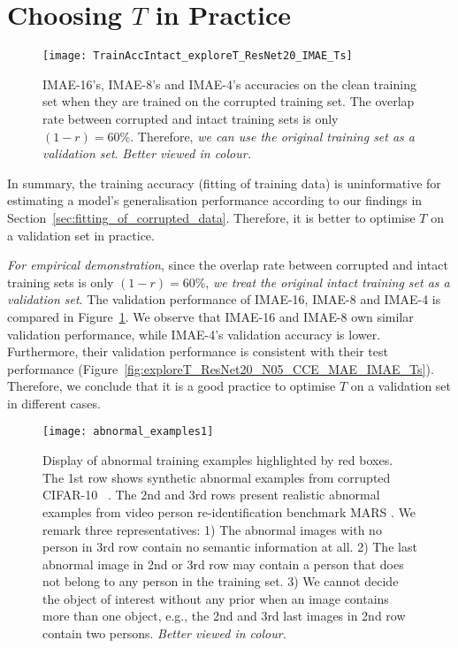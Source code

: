 \documentclass{article}
\begin{document}
\section{Choosing $T$ in Practice}

\begin{figure}[!h]
	\centering
	\texttt{[image: TrainAccIntact\_exploreT\_ResNet20\_IMAE\_Ts]}
	\caption{
		IMAE-16's, IMAE-8's and IMAE-4's accuracies on the clean training set when they are trained on the corrupted training set.
		The overlap rate between corrupted and intact training sets is only $(1-r)= 60\%$. Therefore, \textit{we can use the original training set as a validation set}.  
		\textit{Better viewed in colour.}
	}
	\label{fig:TrainAccIntact_exploreT_ResNet20_IMAE_Ts}
\end{figure}


In summary, the training accuracy (fitting of training data) is uninformative for estimating a model's generalisation performance according to our findings in Section~\ref{sec:fitting_of_corrupted_data}. 
Therefore, it is better to optimise $T$ on a validation set in practice.

\textit{For empirical demonstration}, since the overlap rate between corrupted and intact training sets is only $(1-r)= 60\%$, \textit{{we treat the original intact training set as a validation set}}. The validation performance of IMAE-16, IMAE-8 and IMAE-4 is compared in Figure~\ref{fig:TrainAccIntact_exploreT_ResNet20_IMAE_Ts}.
We observe that IMAE-16 and IMAE-8 own similar validation performance, while IMAE-4's validation accuracy is lower. 
Furthermore, their validation performance is consistent with their test performance (Figure~\ref{fig:exploreT_ResNet20_N05_CCE_MAE_IMAE_Ts}).  
{Therefore, we conclude that it is a good practice to optimise $T$ on a validation set in different cases.} 




\begin{figure}[!t]
	\centering
	\texttt{[image: abnormal\_examples1]}
	\vspace{-0.16cm}
	\caption{
		Display of abnormal training examples highlighted by red boxes. 
		The 1st row shows synthetic abnormal examples from corrupted CIFAR-10
		~\cite{krizhevsky2009learning}.
		The 2nd and 3rd rows present realistic abnormal examples from video person re-identification benchmark MARS \cite{zheng2016mars}.       
		We remark three representatives: 
		1) The abnormal images with no person in 3rd row contain no semantic information at all. 
		2) The last abnormal image in 2nd or 3rd row may contain a person that does not belong to any person in the training set. 
		3) We cannot decide the object of interest without any prior when an image contains more than one object, e.g., the 2nd and 3rd last images in 2nd row contain two persons.   	
		\textit{Better viewed in colour.}
	}
	\label{fig:abnormal_examples}
	\vspace{-0.25cm}
\end{figure}
\end{document}

